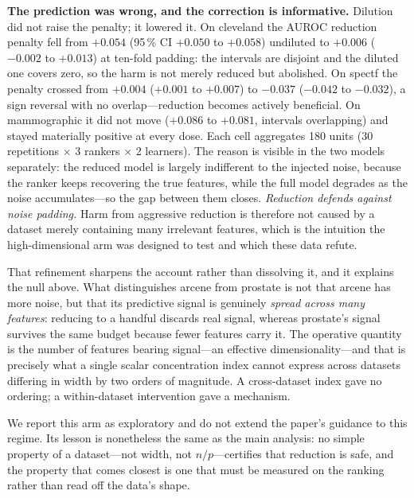 \documentclass[fleqn,10pt]{wlscirep}
\newcommand{\result}[1]{#1}
\begin{document}
\textbf{The prediction was wrong, and the correction is informative.} Dilution did not raise the
penalty; it lowered it. On cleveland the AUROC reduction penalty fell from \result{$+0.054$}
(95\,\% CI \result{$+0.050$} to \result{$+0.058$}) undiluted to \result{$+0.006$}
(\result{$-0.002$} to \result{$+0.013$}) at ten-fold padding: the intervals are disjoint and the
diluted one covers zero, so the harm is not merely reduced but abolished. On spectf the penalty
crossed from \result{$+0.004$} (\result{$+0.001$} to \result{$+0.007$}) to \result{$-0.037$}
(\result{$-0.042$} to \result{$-0.032$}), a sign reversal with no overlap---reduction becomes
actively beneficial. On mammographic it did not move (\result{$+0.086$} to \result{$+0.081$},
intervals overlapping) and stayed materially positive at every dose. Each cell aggregates
\result{180} units (\result{30} repetitions $\times$ \result{3} rankers $\times$ \result{2}
learners). The reason is visible in the two models separately: the
reduced model is largely indifferent to the injected noise, because the ranker keeps recovering the
true features, while the full model degrades as the noise accumulates---so the gap between them closes.
\emph{Reduction defends against noise padding.} Harm from aggressive reduction is therefore not caused
by a dataset merely containing many irrelevant features, which is the intuition the high-dimensional
arm was designed to test and which these data refute.

That refinement sharpens the account rather than dissolving it, and it explains the null above. What
distinguishes arcene from prostate is not that arcene has more noise, but that its predictive signal is
genuinely \emph{spread across many features}: reducing to a handful discards real signal, whereas
prostate's signal survives the same budget because fewer features carry it. The operative quantity is
the number of features bearing signal---an effective dimensionality---and that is precisely what a
single scalar concentration index cannot express across datasets differing in width by two orders of
magnitude. A cross-dataset index gave no ordering; a within-dataset intervention gave a mechanism.

We report this arm as exploratory and do not extend the paper's guidance to this regime. Its lesson
is nonetheless the same as the main analysis: no simple property of a dataset---not width, not
$n/p$---certifies that reduction is safe, and the property that comes closest is one that must
be measured on the ranking rather than read off the data's shape.
\end{document}
